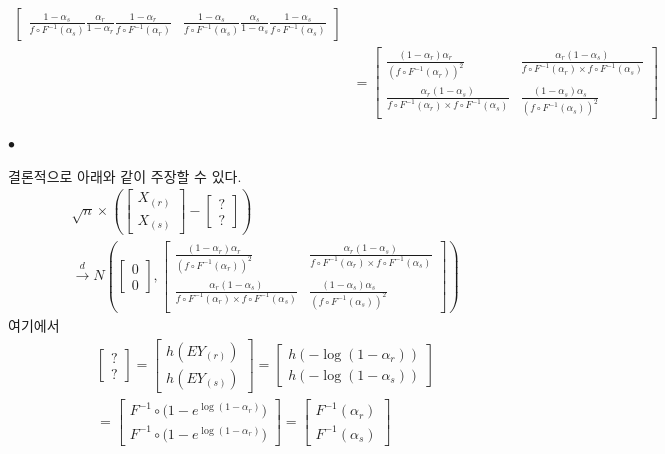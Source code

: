 \documentclass[12pt,oneside,english]{book}
\def\ck{\paragraph{\Large$\bullet$}\Large}
\begin{document}
\begin{align*}
\begin{bmatrix}
\frac{1-\alpha_s}{f\circ F^{-1}(\alpha_s)}\frac{\alpha_r}{1-\alpha_r}\frac{1-\alpha_r}{f\circ F^{-1}(\alpha_r)} & 
\frac{1-\alpha_s}{f\circ F^{-1}(\alpha_s)}\frac{\alpha_s}{1-\alpha_s}\frac{1-\alpha_s}{f\circ F^{-1}(\alpha_s)}
\end{bmatrix}\\
& =
\begin{bmatrix}
\frac{(1-\alpha_r)\alpha_r}{(f\circ F^{-1}(\alpha_r))^2} & \frac{\alpha_r(1-\alpha_s)}{f\circ F^{-1}(\alpha_r) \times f\circ F^{-1}(\alpha_s)} \\ 
\frac{\alpha_r(1-\alpha_s)}{f\circ F^{-1}(\alpha_r) \times f\circ F^{-1}(\alpha_s)} & 
\frac{(1-\alpha_s)\alpha_s}{(f\circ F^{-1}(\alpha_s))^2} 
\end{bmatrix}
\end{align*}

\ck 결론적으로 아래와 같이 주장할 수 있다. 
\begin{align*}
& \sqrt{n}\times\left(\begin{bmatrix}X_{(r)} \\ X_{(s)}\end{bmatrix}-\begin{bmatrix}? \\ ? \end{bmatrix}\right) \\
& \overset{d}{\to} 
N\left(\begin{bmatrix}0\\0\end{bmatrix},\begin{bmatrix}
\frac{(1-\alpha_r)\alpha_r}{(f\circ F^{-1}(\alpha_r))^2} & \frac{\alpha_r(1-\alpha_s)}{f\circ F^{-1}(\alpha_r) \times f\circ F^{-1}(\alpha_s)} \\ 
\frac{\alpha_r(1-\alpha_s)}{f\circ F^{-1}(\alpha_r) \times f\circ F^{-1}(\alpha_s)} & 
\frac{(1-\alpha_s)\alpha_s}{(f\circ F^{-1}(\alpha_s))^2} 
\end{bmatrix}\right)
\end{align*}
여기에서 
\begin{align*}
&\begin{bmatrix}? \\ ? \end{bmatrix}=
\begin{bmatrix}h(EY_{(r)}) \\ h(EY_{(s)}) \end{bmatrix}=\begin{bmatrix}h(-\log(1-\alpha_r)) \\ h(-\log(1-\alpha_s)) \end{bmatrix} \\
&=\begin{bmatrix}F^{-1}\circ \big(1-e^{\log(1-\alpha_r)}
\big) \\ F^{-1}\circ \big(1-e^{\log(1-\alpha_r)}\big)  \end{bmatrix} 
= \begin{bmatrix} F^{-1}(\alpha_r) \\ F^{-1}(\alpha_s) \end{bmatrix}
\end{align*}
\end{document}
